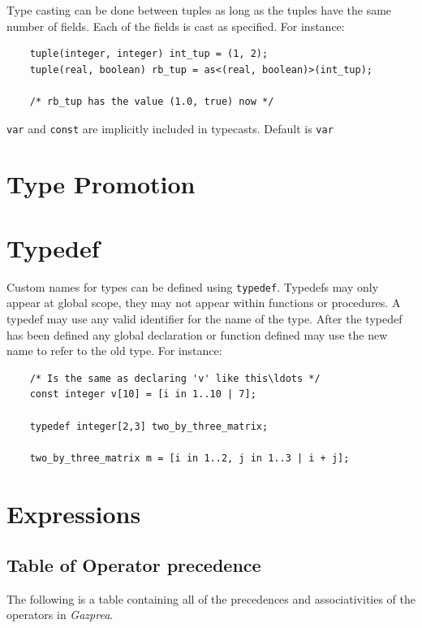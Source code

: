 \documentclass{article}
\begin{document}
  Type casting can be done between tuples as long as the tuples have the same number of fields. Each of the fields is
  cast as specified. For instance:

  \begin{lstlisting}
    tuple(integer, integer) int_tup = (1, 2);
    tuple(real, boolean) rb_tup = as<(real, boolean)>(int_tup);

    /* rb_tup has the value (1.0, true) now */
  \end{lstlisting}

  \texttt{var} and \texttt{const} are implicitly included in typecasts. Default is \texttt{var}


\section{Type Promotion}
\label{sec:typePromotion}


\section{Typedef}\label{sec:typedef}

  Custom names for types can be defined using \texttt{typedef}. Typedefs may only appear at global scope, they may not
  appear within functions or procedures. A typedef may use any valid identifier for the name of the type. After the
  typedef has been defined any global declaration or function defined may use the new name to refer to the old type.
  For instance:

  \begin{lstlisting}
    /* Is the same as declaring 'v' like this\ldots */
    const integer v[10] = [i in 1..10 | 7];

    typedef integer[2,3] two_by_three_matrix;

    two_by_three_matrix m = [i in 1..2, j in 1..3 | i + j];
  \end{lstlisting}


\section{Expressions}\label{sec:expressions}

  \subsection{Table of Operator precedence}\label{sec:operators}

    The following is a table containing all of the precedences and associativities of the operators in
    \textit{Gazprea}.
\end{document}
